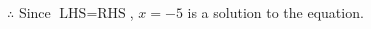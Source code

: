 \documentclass[12pt]{article}
\begin{document}
\begin{multicols}{2}
\begin{minipage}[t]{0.40\textwidth}
    \noindent \(\therefore\) Since \(\text{LHS} = \text{RHS}\), \(x = -5\) is  a solution to the equation.

\end{minipage}

\vspace*{0.5ex}
\vfill{}
\newpage
    
\end{multicols}
\end{document}
